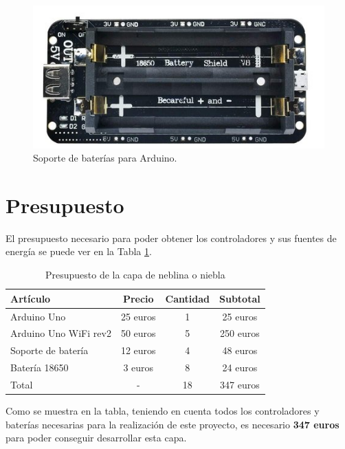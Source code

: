 \begin{figure}[h] 
    \centering
    \includegraphics[width=.40\textwidth]{capitulos/capitulo6/battery.png}
    \caption{Soporte de baterías para Arduino.}
    \label{fig:battery}
\end{figure}

\newpage
\section{Presupuesto}
El presupuesto necesario para poder obtener los controladores y sus fuentes de energía se puede ver en la Tabla \ref{tab:resupuestocontrolador}.

\begin{table}[h]
    \centering
    \begin{tabular}{|l|c|c|c|}
        \rowcolor[gray]{.5}
        \hline
            \color{white}Artículo&\color{white}Precio&\color{white}Cantidad&\color{white}Subtotal  \\
        \hline
            Arduino Uno&25 euros &1&25 euros  \\
        \hline    
            Arduino Uno WiFi rev2&50 euros &5&250 euros  \\
        \hline    
            Soporte de batería&12 euros &4&48 euros  \\
         \hline   
            Batería 18650&3 euros &8&24 euros  \\
        \rowcolor[gray]{.9}
         \hline
            Total&-&18&347 euros  \\
        \hline
    \end{tabular}
    \caption{Presupuesto de la capa de neblina o niebla}
    \label{tab:resupuestocontrolador}
\end{table}

Como se muestra en la tabla, teniendo en cuenta todos los controladores y baterías necesarias para la realización de este proyecto, es necesario \textbf{347 euros} para poder conseguir desarrollar esta capa.